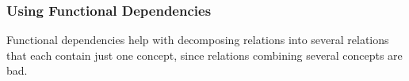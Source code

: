 \subsubsection{Using Functional Dependencies}
Functional dependencies help with decomposing relations into several relations that each contain just one concept,
since relations combining several concepts are bad.
